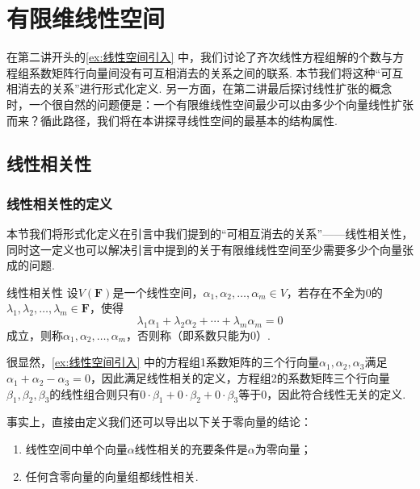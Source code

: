 \chapter{有限维线性空间}

在第二讲开头的\autoref{ex:线性空间引入} 中，我们讨论了齐次线性方程组解的个数与方程组系数矩阵行向量间没有可互相消去的关系之间的联系. 本节我们将这种``可互相消去的关系''进行形式化定义. 另一方面，在第二讲最后探讨线性扩张的概念时，一个很自然的问题便是：一个有限维线性空间最少可以由多少个向量线性扩张而来？循此路径，我们将在本讲探寻线性空间的最基本的结构属性.

\section{线性相关性}

\subsection{线性相关性的定义}

本节我们将形式化定义在引言中我们提到的``可相互消去的关系''——线性相关性，同时这一定义也可以解决引言中提到的关于有限维线性空间至少需要多少个向量张成的问题.
\begin{definition}{线性相关性}{}  
    设$V(\mathbf{F})$是一个线性空间，$\alpha_1,\alpha_2,\ldots,\alpha_m\in V$，若存在不全为0的$\lambda_1,\lambda_2,\ldots,\lambda_m\in\mathbf{F}$，使得
    \[\lambda_1\alpha_1+\lambda_2\alpha_2+\cdots+\lambda_m\alpha_m=0\]
    成立，则称$\alpha_1,\alpha_2,\ldots,\alpha_m$，否则称（即系数只能为0）.
\end{definition}
很显然，\autoref{ex:线性空间引入} 中的方程组1系数矩阵的三个行向量$\alpha_1,\alpha_2,\alpha_3$满足$\alpha_1+\alpha_2-\alpha_3=0$，因此满足线性相关的定义，方程组2的系数矩阵三个行向量$\beta_1,\beta_2,\beta_3$的线性组合则只有$0\cdot\beta_1+0\cdot\beta_2+0\cdot\beta_3$等于0，因此符合线性无关的定义.

事实上，直接由定义我们还可以导出以下关于零向量的结论：
\begin{enumerate}
    \item 线性空间中单个向量$\alpha$线性相关的充要条件是$\alpha$为零向量；

    \item 任何含零向量的向量组都线性相关.
\end{enumerate}

